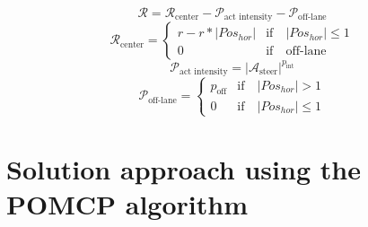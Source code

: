 

\begin{equation*}
    \mathcal{R} = \mathcal{R}_{\textrm{center}} - \mathcal{P}_{\textrm{act intensity}} - \mathcal{P}_{\textrm{off-lane}}
\end{equation*}
\begin{equation*}
    \mathcal{R}_{\textrm{center}} = 
    \begin{cases}
        r - r * |Pos_{hor}| & \text{if} \quad |Pos_{hor}| \leq 1 \\
        0 & \text{if} \quad \text{off-lane}
    \end{cases}
\end{equation*}
\begin{equation*}
    \mathcal{P}_{\textrm{act intensity}} = |\mathcal{A}_{\textrm{steer}}| ^ {p_{\textrm{int}}}
\end{equation*}
\begin{equation*}
    \mathcal{P}_{\textrm{off-lane}} = 
    \begin{cases}
        p_{\textrm{off}} & \text{if} \quad |Pos_{hor}| > 1 \\
        0 & \text{if} \quad |Pos_{hor}| \leq 1
    \end{cases}
\end{equation*}

\section{Solution approach using the POMCP algorithm}

